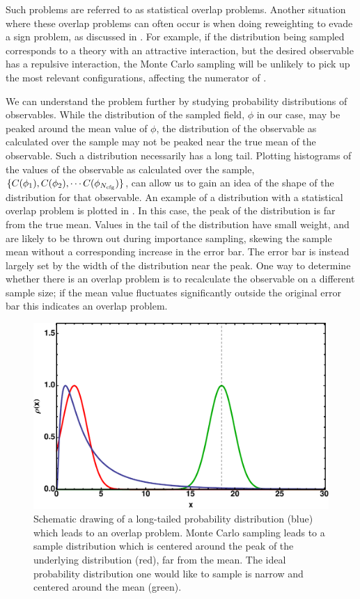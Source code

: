 Such problems are referred to as statistical overlap problems. Another situation where these overlap problems can often occur is when doing reweighting to evade a sign problem, as discussed in . For example, if the distribution being sampled corresponds to a theory with an attractive interaction, but the desired observable has a repulsive interaction, the Monte Carlo sampling will be unlikely to pick up the most relevant configurations, affecting the numerator of .

We can understand the problem further by studying probability distributions of observables. While the distribution of the sampled field, $\phi$ in our case, may be peaked around the mean value of $\phi$, the distribution of the observable as calculated over the sample may not be peaked near the true mean of the observable. Such a distribution necessarily has a long tail. Plotting histograms of the values of the observable as calculated over the sample, $\{ C(\phi_1), C(\phi_2), \cdots C(\phi_{N_{\mbox{\tiny cfg}}}) \}$, can allow us to gain an idea of the shape of the distribution for that observable. An example of a distribution with a statistical overlap problem is plotted in . In this case, the peak of the distribution is far from the true mean. Values in the tail of the distribution have small weight, and are likely to be thrown out during importance sampling, skewing the sample mean without a corresponding increase in the error bar. The error bar is instead largely set by the width of the distribution near the peak. One way to determine whether there is an overlap problem is to recalculate the observable on a different sample size; if the mean value fluctuates significantly outside the original error bar this indicates an overlap problem.

\begin{figure}
\caption{\label{fig:overlap}Schematic drawing of a long-tailed probability distribution (blue) which leads to an overlap problem. Monte Carlo sampling leads to a sample distribution which is centered around the peak of the underlying distribution (red), far from the mean. The ideal probability distribution one would like to sample is narrow and centered around the mean (green).}
\includegraphics[width=0.5\linewidth]{Chapter5-figures/overlap.pdf}
\end{figure}

